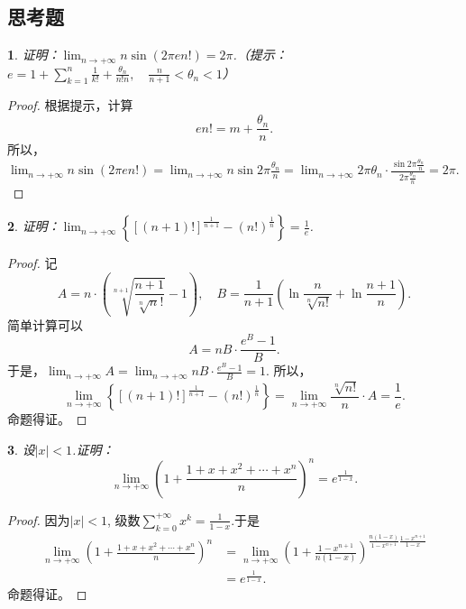 \documentclass[utf8]{book}
\newtheorem{example}{}[section]             %
\begin{document}
\subsection{思考题}
\begin{example}
证明：$\displaystyle\lim_{n\to +\infty}n\sin(2\pi e n!)=2\pi$.（提示：$e=1+\displaystyle\sum_{k=1}^n\frac{1}{k!}+\frac{\theta_n}{n!n}, \quad\frac{n}{n+1}<\theta_n<1$）
\end{example}
\begin{proof}根据提示，计算
$$en!=m+\frac{\theta_n}{n}.$$
所以，$\displaystyle\lim_{n\to +\infty}n\sin(2\pi e n!)=\displaystyle\lim_{n\to +\infty}n\sin{2\pi\frac{\theta_n}{n}}=\displaystyle\lim_{n\to +\infty}2\pi\theta_n\cdot\frac{\sin{2\pi\frac{\theta_n}{n}}}{2\pi\frac{\theta_n}{n}}=2\pi.$
\end{proof}
\begin{example}
证明：$\displaystyle\lim_{n\to +\infty}\left\{\left[(n+1)!\right]^{\frac{1}{n+1}}-(n!)^{\frac{1}{n}}\right\}=\frac{1}{e}$.
\end{example}
\begin{proof}记
$$A=n\cdot\left(\displaystyle\sqrt[n+1]{\frac{n+1}{\sqrt[n]n!}}-1\right), \quad B = \frac{1}{n+1}\left(\ln{\displaystyle\frac{n}{\sqrt[n]{n!}}}+\ln{\frac{n+1}{n}}\right).$$
简单计算可以
$$A=nB\cdot\displaystyle\frac{e^{B}-1}{B}.$$
于是，$\displaystyle\lim_{n\to +\infty}A = \displaystyle\lim_{n\to +\infty}nB\cdot\displaystyle\frac{e^{B}-1}{B}=1$.
所以，
$$\displaystyle\lim_{n\to +\infty}\left\{\left[(n+1)!\right]^{\frac{1}{n+1}}-(n!)^{\frac{1}{n}}\right\}=\displaystyle\lim_{n\to +\infty}\frac{\sqrt[n]{n!}}{n}\cdot A=\frac{1}{e}.$$
命题得证。
\end{proof}
\begin{example}
设$|x| < 1$.证明：
$$\displaystyle\lim_{n\to +\infty}\left(1+\displaystyle\frac{1+x+x^2+\cdots+x^n}{n}\right)^n=e^{\frac{1}{1-x}}.$$
\end{example}
\begin{proof}因为$|x|< 1$, 级数$\displaystyle\sum_{k=0}^{+\infty}x^k = \frac{1}{1-x}$.于是
\begin{equation*}
\begin{split}
\displaystyle\lim_{n\to +\infty}\left(1+\displaystyle\frac{1+x+x^2+\cdots+x^n}{n}\right)^n&=\displaystyle\lim_{n\to +\infty}\left(1+\frac{1-x^{n+1}}{n(1-x)}\right)^{\frac{n(1-x)}{1-x^{n+1}}\frac{1-x^{n+1}}{1-x}}\\&=e^{\frac{1}{1-x}}.
\end{split}
\end{equation*}
命题得证。
\end{proof}
\end{document}
